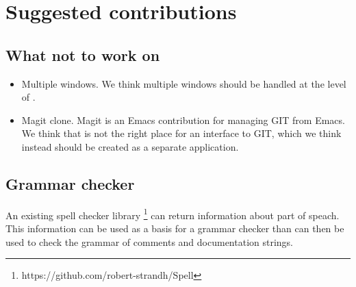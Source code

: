 \chapter{Suggested contributions}

\section{What not to work on}

\begin{itemize}
\item Multiple windows.  We think multiple windows should be handled
  at the level of \mcclim{}.
\item Magit clone.  Magit is an Emacs contribution for managing GIT
  from Emacs.  We think that \sysname{} is not the right place for an
  interface to GIT, which we think instead should be created as a
  separate \clim{} application.
\end{itemize}

\section{Grammar checker}

An existing spell checker library%
\footnote{https://github.com/robert-strandh/Spell} can return
information about part of speach.  This information can be used as a
basis for a grammar checker than can then be used to check the grammar
of comments and documentation strings.
